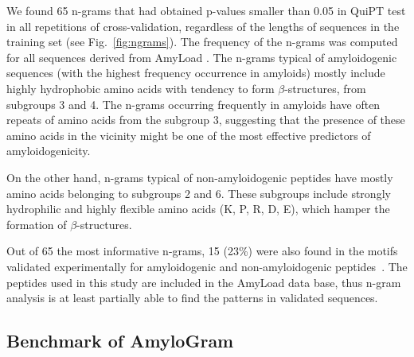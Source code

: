 \documentclass[fleqn,10pt,twoside]{gcb15submission}
\begin{document}
  We found 65 n-grams that had  obtained p-values smaller than 0.05 in QuiPT test 
%
%
%
%
%
in all repetitions of cross-validation, regardless of the lengths of sequences in 
the training set (see Fig.~\ref{fig:ngrams}). The frequency of the n-grams was 
computed for all sequences derived from AmyLoad . The n-grams typical of 
amyloidogenic sequences (with the highest frequency occurrence in amyloids) mostly  include 
highly hydrophobic amino acids with tendency to form $\beta$-structures, 
from subgroups 3 and 4. The n-grams occurring frequently in amyloids have often 
repeats of amino acids from the subgroup 3, suggesting that the presence of 
these amino acids in the vicinity might be one of the most effective predictors of 
amyloidogenicity.

  On the other hand, n-grams typical of non-amyloidogenic peptides have mostly 
amino acids belonging to subgroups 2 and 6. These subgroups include strongly 
hydrophilic and highly flexible amino acids (K, P, R, D, E), which hamper the 
formation of $\beta$-structures.

  Out of 65 the most informative n-grams, 15 (23\%) were also found in the motifs 
validated experimentally for amyloidogenic and non-amyloidogenic 
peptides~\citep{lopez_de_la_paz_sequence_2004}. The peptides used in this study are 
included in the AmyLoad data base, thus n-gram analysis is at least 
partially able to find the patterns in validated sequences.

\subsection{Benchmark of AmyloGram}
\end{document}
